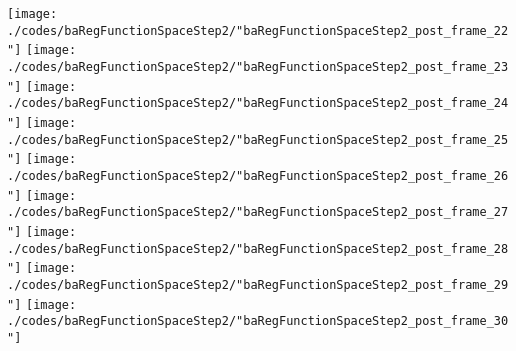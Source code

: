 \begin{frame}{\insertsection}
\begin{center}
{\begin{animateinline}{15}
				 \texttt{[image: ./codes/baRegFunctionSpaceStep2/"baRegFunctionSpaceStep2\_post\_frame\_22"]}\newframe
				 \texttt{[image: ./codes/baRegFunctionSpaceStep2/"baRegFunctionSpaceStep2\_post\_frame\_23"]}\newframe
				 \texttt{[image: ./codes/baRegFunctionSpaceStep2/"baRegFunctionSpaceStep2\_post\_frame\_24"]}\newframe
				 \texttt{[image: ./codes/baRegFunctionSpaceStep2/"baRegFunctionSpaceStep2\_post\_frame\_25"]}\newframe
				 \texttt{[image: ./codes/baRegFunctionSpaceStep2/"baRegFunctionSpaceStep2\_post\_frame\_26"]}\newframe
				 \texttt{[image: ./codes/baRegFunctionSpaceStep2/"baRegFunctionSpaceStep2\_post\_frame\_27"]}\newframe
				 \texttt{[image: ./codes/baRegFunctionSpaceStep2/"baRegFunctionSpaceStep2\_post\_frame\_28"]}\newframe
				 \texttt{[image: ./codes/baRegFunctionSpaceStep2/"baRegFunctionSpaceStep2\_post\_frame\_29"]}\newframe
				 \texttt{[image: ./codes/baRegFunctionSpaceStep2/"baRegFunctionSpaceStep2\_post\_frame\_30"]}
			 \end{animateinline}
			}
	\end{center}
    
\end{frame}









